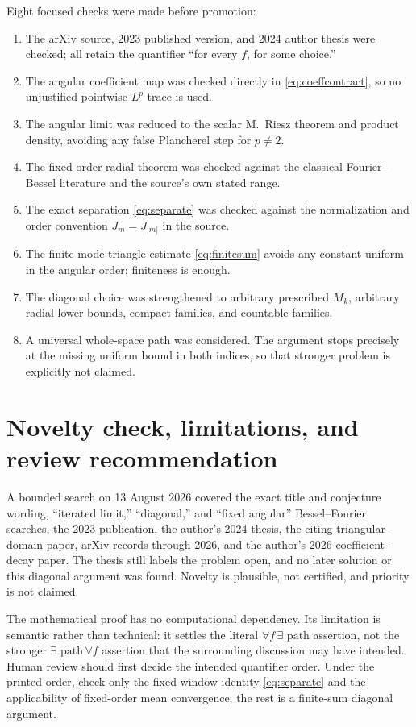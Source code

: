 \documentclass[11pt]{article}
\begin{document}
Eight focused checks were made before promotion:
\begin{enumerate}
\item The arXiv source, 2023 published version, and 2024 author thesis were
checked; all retain the quantifier ``for every $f$, for some choice.''
\item The angular coefficient map was checked directly in
\eqref{eq:coeffcontract}, so no unjustified pointwise $L^p$ trace is used.
\item The angular limit was reduced to the scalar M.~Riesz theorem and product
density, avoiding any false Plancherel step for $p\ne2$.
\item The fixed-order radial theorem was checked against the classical
Fourier--Bessel literature and the source's own stated range.
\item The exact separation \eqref{eq:separate} was checked against the
normalization and order convention $J_m=J_{|m|}$ in the source.
\item The finite-mode triangle estimate \eqref{eq:finitesum} avoids any
constant uniform in the angular order; finiteness is enough.
\item The diagonal choice was strengthened to arbitrary prescribed $M_k$,
arbitrary radial lower bounds, compact families, and countable families.
\item A universal whole-space path was considered.  The argument stops
precisely at the missing uniform bound in both indices, so that stronger
problem is explicitly not claimed.
\end{enumerate}

\section{Novelty check, limitations, and review recommendation}

A bounded search on 13 August 2026 covered the exact title and conjecture
wording, ``iterated limit,'' ``diagonal,'' and ``fixed angular''
Bessel--Fourier searches, the 2023 publication, the author's 2024 thesis, the
citing triangular-domain paper, arXiv records through 2026, and the author's
2026 coefficient-decay paper.  The thesis still labels the problem open, and
no later solution or this diagonal argument was found.  Novelty is plausible,
not certified, and priority is not claimed.

The mathematical proof has no computational dependency.  Its limitation is
semantic rather than technical: it settles the literal
$\forall f\,\exists\text{ path}$ assertion, not the stronger
$\exists\text{ path}\,\forall f$ assertion that the surrounding discussion
may have intended.  Human review should first decide the intended quantifier
order.  Under the printed order, check only the fixed-window identity
\eqref{eq:separate} and the applicability of fixed-order mean convergence;
the rest is a finite-sum diagonal argument.
\end{document}
